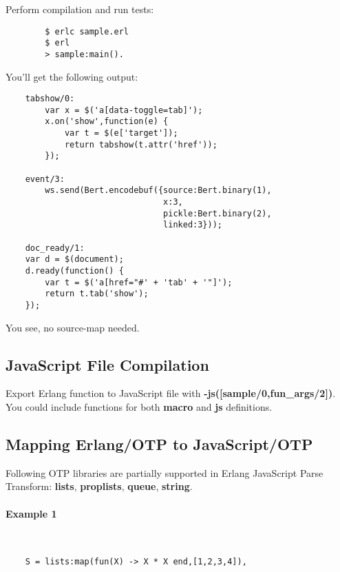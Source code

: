 \newpage
Perform compilation and run tests:

\vspace{1\baselineskip}
\begin{lstlisting}
        $ erlc sample.erl
        $ erl
        > sample:main().
\end{lstlisting}
\vspace{1\baselineskip}

You'll get the following output:

\vspace{1\baselineskip}
\begin{lstlisting}
    tabshow/0:
        var x = $('a[data-toggle=tab]');
        x.on('show',function(e) {
            var t = $(e['target']);
            return tabshow(t.attr('href'));
        });

    event/3:
        ws.send(Bert.encodebuf({source:Bert.binary(1),
                                x:3,
                                pickle:Bert.binary(2),
                                linked:3}));

    doc_ready/1:
    var d = $(document);
    d.ready(function() {
        var t = $('a[href="#' + 'tab' + '"]');
        return t.tab('show');
    });
\end{lstlisting}
\vspace{1\baselineskip}

You see, no source-map needed.

\subsection{JavaScript File Compilation}
Export Erlang function to JavaScript file with {\bf -js([sample/0,fun\_{args}/2])}.
You could include functions for both {\bf macro} and {\bf js} definitions.

\newpage
\subsection{Mapping Erlang/OTP to JavaScript/OTP}
Following OTP libraries are partially supported in Erlang JavaScript Parse Transform: 
{\bf lists}, {\bf proplists}, {\bf queue}, {\bf string}.

\paragraph{\bf Example 1}\ 
\vspace{1\baselineskip}
\begin{lstlisting}
    S = lists:map(fun(X) -> X * X end,[1,2,3,4]),
\end{lstlisting}

